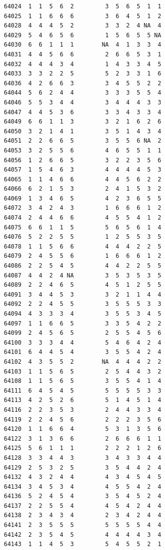 \documentclass[
  letterpaper,
  DIV=11,
  numbers=noendperiod]{scrreprt}
\begin{document}
\begin{verbatim}
64024  1  1  5  6  2         3  5  6  5  1  1
64025  1  1  6  6  6         3  6  4  5  1  2
64028  4  4  4  5  2         3  3  2  4 NA  4
64029  5  4  6  5  6         1  5  6  5  5 NA
64030  6  6  1  1  1        NA  4  1  3  3  4
64031  4  4  5  6  6         2  6  6  5  3  1
64032  4  4  4  3  4         1  4  3  3  4  5
64033  3  3  2  2  5         5  2  3  3  1  6
64036  4  2  6  6  3         3  4  5  5  2  2
64044  5  6  2  4  4         3  3  3  5  5  4
64046  5  5  3  4  4         3  4  4  4  3  3
64047  4  4  5  3  6         3  3  4  3  3  4
64049  6  6  1  1  3         3  2  1  6  2  6
64050  3  2  1  4  1         3  5  1  4  3  4
64051  2  2  6  6  5         3  5  5  6 NA  2
64053  3  2  5  5  6         4  6  5  5  1  1
64056  1  2  6  6  5         3  2  2  3  5  6
64057  1  5  4  6  3         4  4  4  4  5  3
64065  1  1  4  6  6         4  4  5  6  2  2
64066  6  2  1  5  3         2  4  1  5  3  2
64069  1  3  4  6  5         4  2  3  6  5  5
64072  3  4  2  4  3         1  6  6  6  1  2
64074  2  4  4  6  6         4  5  5  4  1  2
64075  6  6  1  1  5         5  6  5  6  1  4
64076  5  2  2  5  5         1  2  5  5  3  5
64078  1  1  5  6  6         4  4  4  2  2  5
64079  2  4  5  5  6         1  6  6  6  1  2
64086  2  2  5  4  5         4  4  2  2  5  5
64087  4  4  2  4 NA         3  5  3  5  3  5
64089  2  2  4  6  5         4  5  1  2  5  5
64091  3  4  4  5  3         3  2  1  1  4  4
64092  2  2  4  5  5         3  5  5  5  3  3
64094  4  3  3  3  4         3  5  5  3  4  5
64097  1  1  6  6  5         3  3  5  4  2  2
64099  2  4  5  6  5         2  5  5  4  5  6
64100  3  3  3  4  4         5  4  6  4  2  4
64101  6  4  4  5  4         3  5  5  4  2  4
64102  4  3  5  5  2        NA  4  4  4  2  2
64103  1  1  5  6  5         2  5  4  4  3  2
64108  1  1  5  6  5         3  5  5  4  1  4
64111  6  4  5  4  5         5  5  5  5  3  3
64113  4  2  5  2  6         5  1  4  5  1  4
64116  2  2  3  5  3         2  4  4  3  3  4
64119  2  2  4  5  6         2  2  2  3  5  6
64120  1  1  6  6  4         5  3  1  3  5  6
64122  3  1  3  6  6         2  6  6  6  1  1
64125  5  6  1  1  1         2  2  2  1  2  6
64128  3  3  4  4  3         3  4  3  3  4  4
64129  2  5  3  2  5         3  5  4  4  2  4
64132  4  3  2  4  4         4  3  4  5  4  5
64134  3  4  5  3  4         4  5  5  4  2  4
64136  5  2  4  5  4         3  5  4  5  2  4
64137  2  2  5  5  4         4  5  4  2  4  4
64138  2  3  4  3  4         2  3  4  2  4  4
64141  2  3  5  5  5         5  5  5  5  4  4
64142  2  3  5  4  5         4  4  4  4  3  4
64143  1  1  4  5  3         5  4  5  5  2  1

\end{verbatim}
\end{document}
